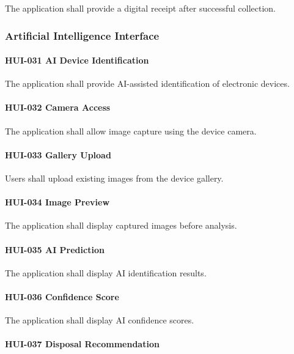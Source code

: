 The application shall provide a digital receipt after successful
collection.


\subsubsection*{Artificial Intelligence Interface}

\paragraph{HUI-031 AI Device Identification}

The application shall provide AI-assisted identification of electronic
devices.

\paragraph{HUI-032 Camera Access}

The application shall allow image capture using the device camera.

\paragraph{HUI-033 Gallery Upload}

Users shall upload existing images from the device gallery.

\paragraph{HUI-034 Image Preview}

The application shall display captured images before analysis.

\paragraph{HUI-035 AI Prediction}

The application shall display AI identification results.

\paragraph{HUI-036 Confidence Score}

The application shall display AI confidence scores.

\paragraph{HUI-037 Disposal Recommendation}

